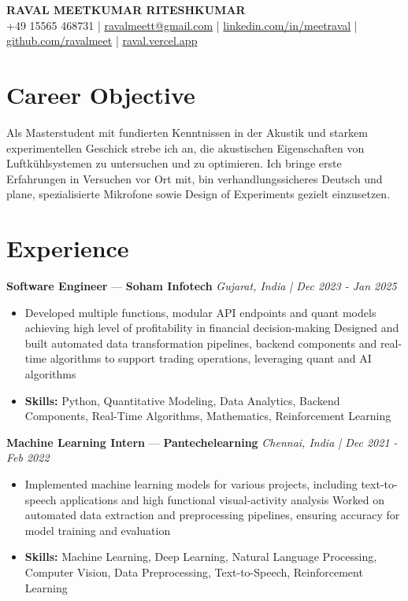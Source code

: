 \documentclass[a4paper,10pt]{article}
\begin{document}
\begin{center}
  {\Large\bfseries RAVAL MEETKUMAR RITESHKUMAR}\\[2pt]
  {\small +49 15565 468731 \;|\; \href{mailto:ravalmeett@gmail.com}{ravalmeett@gmail.com} \;|\; \href{https://www.linkedin.com/in/meetraval/}{linkedin.com/in/meetraval} \;|\; \href{https://github.com/ravalmeet}{github.com/ravalmeet} \;|\; \href{https://raval.vercel.app/}{raval.vercel.app}}
\end{center}
\vspace{-3pt}

\section*{Career Objective}
Als Masterstudent mit fundierten Kenntnissen in der Akustik und starkem experimentellen Geschick strebe ich an, die akustischen Eigenschaften von Luftkühlsystemen zu untersuchen und zu optimieren. Ich bringe erste Erfahrungen in Versuchen vor Ort mit, bin verhandlungssicheres Deutsch und plane, spezialisierte Mikrofone sowie Design of Experiments gezielt einzusetzen.\par

\section*{Experience}
\textbf{Software Engineer} — \textbf{Soham Infotech} \hfill \textit{Gujarat, India \;|\; Dec 2023 - Jan 2025}\par
\vspace{1pt}
\begin{itemize}
  \item Developed multiple functions, modular API endpoints and quant models achieving high level of profitability in financial decision-making Designed and built automated data transformation pipelines, backend components and real-time algorithms to support trading operations, leveraging quant and AI algorithms
  \item \textbf{Skills:} Python, Quantitative Modeling, Data Analytics, Backend Components, Real-Time Algorithms, Mathematics, Reinforcement Learning
\end{itemize}
\vspace{3pt}
\textbf{Machine Learning Intern} — \textbf{Pantechelearning} \hfill \textit{Chennai, India \;|\; Dec 2021 - Feb 2022}\par
\vspace{1pt}
\begin{itemize}
  \item Implemented machine learning models for various projects, including text-to-speech applications and high functional visual-activity analysis Worked on automated data extraction and preprocessing pipelines, ensuring accuracy for model training and evaluation
  \item \textbf{Skills:} Machine Learning, Deep Learning, Natural Language Processing, Computer Vision, Data Preprocessing, Text-to-Speech, Reinforcement Learning
\end{itemize}
\end{document}
